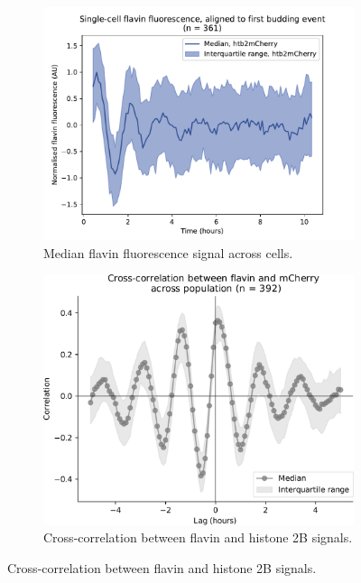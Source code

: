 \begin{figure}
\begin{subfigure}[htpb]{0.4\textwidth}
  \end{subfigure}%
  \begin{subfigure}[htpb]{0.4\textwidth}
   \centering
   \includegraphics[width=\textwidth]{htb2mCherry_26643_6}
   \caption{
    Median flavin fluorescence signal across cells.%
   }
   \label{fig:biology-highglc-sync-median}
  \end{subfigure}

  \begin{subfigure}[htpb]{0.4\textwidth}
   \centering
   \includegraphics[width=\textwidth]{xcf_edit.pdf}
   \caption{
    Cross-correlation between flavin and histone 2B signals.%
   }
   \label{fig:biology-highglc-sync-xcf}
  \end{subfigure}


\end{figure}
